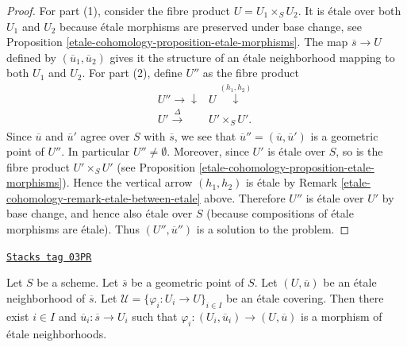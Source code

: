 \begin{proof}
For part (1), consider the fibre product $U = U_1 \times_S U_2$.
It is \'etale over both $U_1$ and $U_2$ because \'etale morphisms are
preserved under base change, see
Proposition \ref{etale-cohomology-proposition-etale-morphisms}.
The map $\overline{s} \to U$ defined by $(\overline{u}_1, \overline{u}_2)$
gives it the structure of an \'etale neighborhood mapping to both
$U_1$ and $U_2$. For part (2), define $U''$ as the fibre product
$$
\begin{array}{cc}U'' \longrightarrow\downarrow & U \overset{(h_1, h_2)}{\downarrow} \\ U' \overset{\Delta}{\longrightarrow} & U' \times_S U'.\end{array}
$$
Since $\overline{u}$ and $\overline{u}'$ agree over $S$ with $\overline{s}$,
we see that $\overline{u}'' = (\overline{u}, \overline{u}')$ is a geometric
point of $U''$. In particular $U'' \not = \emptyset$.
Moreover, since $U'$ is \'etale over $S$, so is the fibre product
$U'\times_S U'$ (see
Proposition \ref{etale-cohomology-proposition-etale-morphisms}).
Hence the vertical arrow $(h_1, h_2)$ is \'etale by
Remark \ref{etale-cohomology-remark-etale-between-etale} above.
Therefore $U''$ is \'etale over $U'$ by base change, and hence also
\'etale over $S$ (because compositions of \'etale morphisms are \'etale).
Thus $(U'', \overline{u}'')$ is a solution to the problem.
\end{proof}

\begin{lemma}
\label{etale-cohomology-lemma-geometric-lift-to-cover}
\href{https://stacks.math.columbia.edu/tag/03PR}{\texttt{Stacks tag 03PR}}

Let $S$ be a scheme.
Let $\overline{s}$ be a geometric point of $S$.
Let $(U, \overline{u})$ be an \'etale neighborhood of $\overline{s}$.
Let $\mathcal{U} = \{\varphi_i : U_i \to U \}_{i\in I}$ be an \'etale covering.
Then there exist $i \in I$ and $\overline{u}_i : \overline{s} \to U_i$
such that $\varphi_i : (U_i, \overline{u}_i) \to (U, \overline{u})$
is a morphism of \'etale neighborhoods.
\end{lemma}

